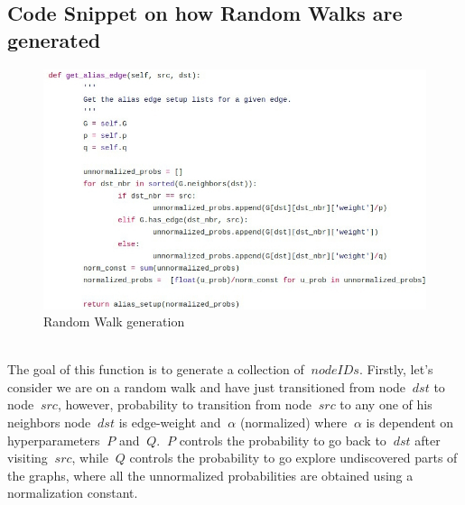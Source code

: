 \documentclass[a4paper,13pt]{article}
\begin{document}
\subsection{Code Snippet on how Random Walks are generated}
    \begin{figure}[h!]
        \center
        \includegraphics[scale=0.4]{screen-shots/edgelists.jpeg}
        \caption{Random Walk generation}
        \label{fig:my_label}
    \end{figure}
    \FloatBarrier
    \\
The goal of this function is to generate a collection of $\ node IDs $. Firstly, let's consider we are on a random walk and have just transitioned from node $\ dst $ to node $\ src $, however, probability to transition from node $\ src $  to any one of his neighbors node $\ dst$ is edge-weight and $\ \alpha $ (normalized) where $\ \alpha $ is dependent on hyperparameters $\ P $ and $\ Q $. $\ P $ controls the probability to go back to $\ dst $ after visiting $\ src $, while $\ Q $ controls the probability to go explore undiscovered parts of the graphs, where all the unnormalized probabilities are obtained using a normalization constant.
\end{document}
